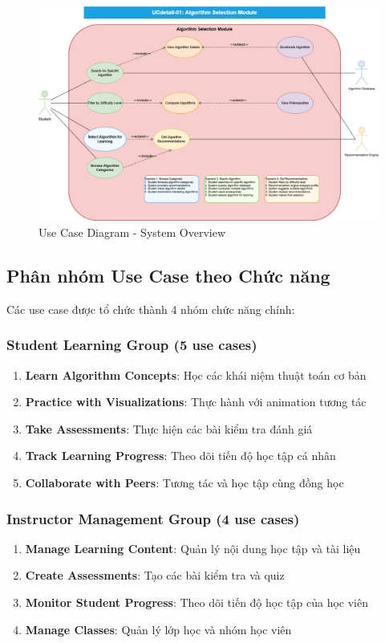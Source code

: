 \begin{figure}[H]
\centering
\includegraphics[width=1.0\textwidth]{enhanced-diagrams/UCdetail-01-algorithm-selection.png}
\caption{Use Case Diagram - System Overview}
\label{fig:usecase-system-overview}
\end{figure}

\subsection{Phân nhóm Use Case theo Chức năng}
\label{subsec:use-case-functional-groups}

Các use case được tổ chức thành 4 nhóm chức năng chính:

\subsubsection{Student Learning Group (5 use cases)}
\begin{enumerate}
    \item \textbf{Learn Algorithm Concepts}: Học các khái niệm thuật toán cơ bản
    \item \textbf{Practice with Visualizations}: Thực hành với animation tương tác
    \item \textbf{Take Assessments}: Thực hiện các bài kiểm tra đánh giá
    \item \textbf{Track Learning Progress}: Theo dõi tiến độ học tập cá nhân
    \item \textbf{Collaborate with Peers}: Tương tác và học tập cùng đồng học
\end{enumerate}

\subsubsection{Instructor Management Group (4 use cases)}
\begin{enumerate}
    \item \textbf{Manage Learning Content}: Quản lý nội dung học tập và tài liệu
    \item \textbf{Create Assessments}: Tạo các bài kiểm tra và quiz
    \item \textbf{Monitor Student Progress}: Theo dõi tiến độ học tập của học viên
    \item \textbf{Manage Classes}: Quản lý lớp học và nhóm học viên
\end{enumerate}

